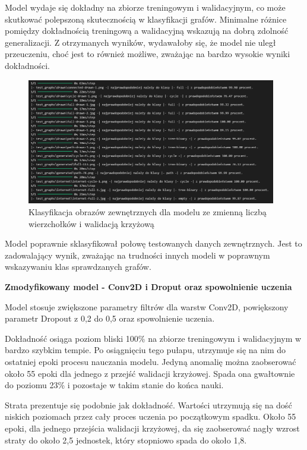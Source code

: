 Model wydaje się dokładny na zbiorze treningowym i walidacyjnym,
co może skutkować polepszoną skutecznością w klasyfikacji grafów.
Minimalne różnice pomiędzy dokładnością treningową a walidacyjną wskazują na dobrą zdolność generalizacji.
Z otrzymanych wyników, wydawałoby się, że model nie uległ przeuczeniu,
choć jest to również możliwe, zważając na bardzo wysokie wyniki dokładności. 

\begin{figure}[ht]
	\centering
	\includegraphics[height=5.5cm]{resources/tests/images/v3/multiple_edges_crossvalid_txt.png}
	\caption{Klasyfikacja obrazów zewnętrznych dla modelu ze zmienną liczbą wierzchołków i walidacją krzyżową}
	\label{Fig:tests-csvar-0b}
\end{figure}
\FloatBarrier

Model poprawnie sklasyfikował połowę testowanych danych zewnętrznych.
Jest to zadowalający wynik, zważając na trudności innych modeli w poprawnym wskazywaniu klas sprawdzanych grafów.

\textbf{Zmodyfikowany model - Conv2D i Droput oraz spowolnienie uczenia}

Model stosuje zwiększone parametry filtrów dla warstw Conv2D, powiększony parametr Dropout z 0,2 do 0,5
oraz spowolnienie uczenia.

Dokładność osiąga poziom bliski 100\% na zbiorze treningowym i walidacyjnym w bardzo szybkim tempie.
Po osiągnięciu tego pułapu, utrzymuje się na nim do ostatniej epoki procesu nauczania modelu.
Jedyną anomalię można zaobserować około 55 epoki dla jednego z przejść walidacji krzyżowej.
Spada ona gwałtownie do poziomu 23\% i pozostaje w takim stanie do końca nauki.

Strata prezentuje się podobnie jak dokładność.
Wartości utrzymują się na dość niskich poziomach przez cały proces uczenia po początkowym spadku.
Około 55 epoki, dla jednego przejścia walidacji krzyżowej,
da się zaobserować nagły wzrost straty do około 2,5 jednostek, który stopniowo spada do około 1,8.

